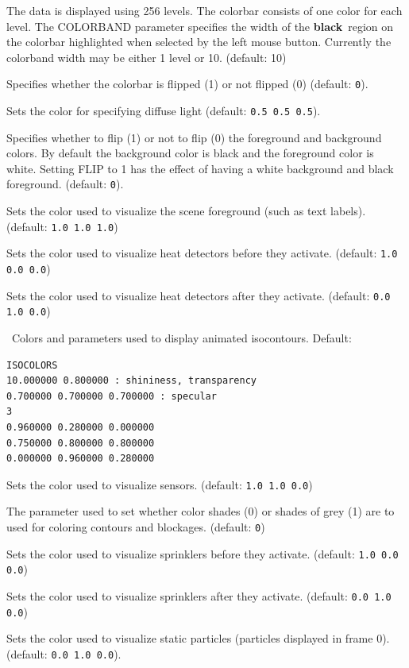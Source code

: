\documentclass[11pt,twoside]{book}
\newcommand{\hitem}[1]{\item[{\bf #1} \hfill]}
\begin{document}
\hitem{COLORBAND} The data is displayed using 256 levels.  The colorbar consists of one color for each level.  The COLORBAND parameter specifies the width of the {\bf black}\ region on the colorbar highlighted when selected by the left mouse button.  Currently the colorband width may be either 1 level or 10. (default: 10)

\hitem{COLORBARFLIP} Specifies whether the colorbar is flipped (1) or not flipped (0)
(default: {\tt 0}).
\hitem{DIFFUSELIGHT} Sets the color for specifying diffuse light (default: {\tt 0.5 0.5
0.5}).
\hitem{FLIP} Specifies whether to flip (1) or not to flip (0) the foreground and background
colors.  By default the background color is black and the foreground color
is white.  Setting FLIP to 1 has the effect of having a white background and black foreground.
(default: {\tt 0}).

\hitem{FOREGROUNDCOLOR}Sets the color used to visualize
the scene foreground (such as text labels).
(default: {\tt 1.0 1.0 1.0})

\hitem{HEATOFFCOLOR}Sets the color used to visualize
heat detectors before they activate.
(default: {\tt 1.0 0.0 0.0})

\hitem{HEATONCOLOR}Sets the color used to visualize
heat detectors after they activate.
(default: {\tt 0.0 1.0 0.0})


\hitem{ISOCOLORS}\ Colors and parameters used to display animated isocontours.
Default:
\begin{verbatim}
ISOCOLORS
10.000000 0.800000 : shininess, transparency
0.700000 0.700000 0.700000 : specular
3
0.960000 0.280000 0.000000
0.750000 0.800000 0.800000
0.000000 0.960000 0.280000
\end{verbatim}

\hitem{SENSORCOLOR}Sets the color used to visualize sensors.
(default: {\tt 1.0 1.0 0.0})

\hitem{SETBW}The parameter used to set whether color shades (0) or shades of grey (1)
are to used for coloring contours and blockages.
(default: {\tt 0})

\hitem{SPRINKOFFCOLOR}Sets the color used to visualize
sprinklers before they activate.
(default: {\tt 1.0 0.0 0.0})

\hitem{SPRINKONCOLOR}Sets the color used to visualize
sprinklers after they activate.
(default: {\tt 0.0 1.0 0.0})

\hitem{STATICPARTCOLOR}Sets the color used to visualize static particles (particles
displayed in frame 0).
 (default: {\tt 0.0 1.0 0.0}).
\end{document}
